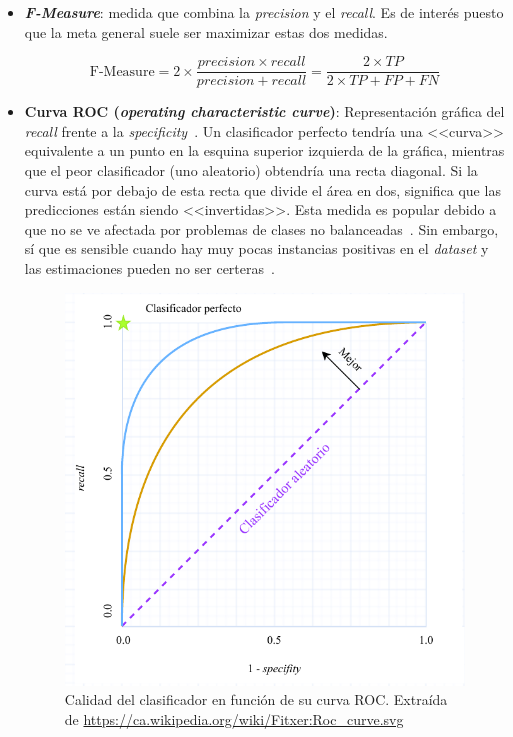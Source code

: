 \begin{itemize}
	
	\item \textbf{\textit{F-Measure}}: medida que combina la \textit{precision} y el \textit{recall}. Es de interés puesto que la meta general suele ser maximizar estas dos medidas.
	
	\begin{equation}\label{eqn:f-measure} \textrm{F-Measure} = 2 \times \frac{precision \times recall}{precision + recall} = \frac{ 2 \times TP}{2 \times TP + FP + FN} \end{equation}
	
	\item \textbf{Curva ROC (\textit{operating characteristic curve})}: Representación gráfica del \textit{recall} frente a la \textit{specificity}~\cite{AUC2022google}. Un clasificador perfecto tendría una <<curva>> equivalente a un punto en la esquina superior izquierda de la gráfica, mientras que el peor clasificador (uno aleatorio) obtendría una recta diagonal. Si la curva está por debajo de esta recta que divide el área en dos, significa que las predicciones están siendo <<invertidas>>. Esta medida es popular debido a que no se ve afectada por problemas de clases no balanceadas~\cite{AUC2020imbalanced}. Sin embargo, sí que es sensible cuando hay muy pocas instancias positivas en el \textit{dataset} y las estimaciones pueden no ser certeras~\cite{leaningImbalanced2018Salvador}.
	
	\begin{figure}[h]
		\caption[Curva ROC]{Calidad del clasificador en función de su curva ROC. Extraída de \url{https://ca.wikipedia.org/wiki/Fitxer:Roc_curve.svg}}
		\label{img:curva_roc}
		\centering
		\includegraphics[scale=0.2]{../img/memoria/3_curva_roc}
	\end{figure}


\end{itemize}
